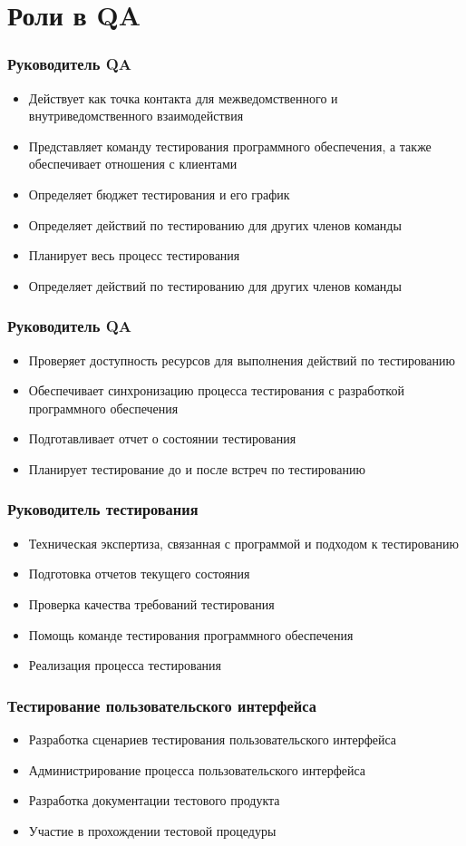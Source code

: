 \documentclass{../industrial-development}
\begin{document}
\section{Роли в QA}
	\begin{frame} \frametitle{Руководитель QA}
		\begin{itemize}
			\item Действует как точка контакта для межведомственного и внутриведомственного взаимодействия
			\item Представляет команду тестирования программного обеспечения, а также обеспечивает отношения с клиентами
			\item Определяет бюджет тестирования и его график
			\item Определяет действий по тестированию для других членов команды
			\item Планирует весь процесс тестирования
			\item Определяет действий по тестированию для других членов команды
		\end{itemize}
	\end{frame}
	\begin{frame} \frametitle{Руководитель QA}
		\begin{itemize}
			\item Проверяет доступность ресурсов для выполнения действий по тестированию
			\item Обеспечивает синхронизацию процесса тестирования с разработкой программного обеспечения
			\item Подготавливает отчет о состоянии тестирования
			\item Планирует тестирование до и после встреч по тестированию
		\end{itemize}
	\end{frame}
	\begin{frame} \frametitle{Руководитель тестирования}
		\begin{itemize}
			\item Техническая экспертиза, связанная с программой и подходом к тестированию
			\item Подготовка отчетов текущего состояния
			\item Проверка качества требований тестирования
			\item Помощь команде тестирования программного обеспечения
			\item Реализация процесса тестирования
		\end{itemize}
	\end{frame}
	\begin{frame} \frametitle{Тестирование пользовательского интерфейса}
		\begin{itemize}
			\item Разработка сценариев тестирования пользовательского интерфейса
			\item Администрирование процесса пользовательского интерфейса
			\item Разработка документации тестового продукта
			\item Участие в прохождении тестовой процедуры
		\end{itemize}
	\end{frame}
\end{document}
